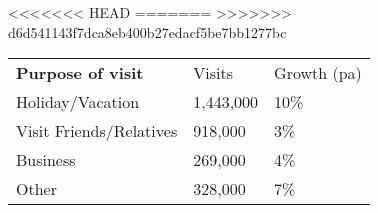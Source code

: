 <<<<<<< HEAD
=======
>>>>>>> d6d541143f7dca8eb400b27edacf5be7bb1277bc
\begin{tabular}[t]{p{4.7cm}>{\hfill}p{1.1cm}>{\hfill}p{1.7cm}}
 \textbf{Purpose of visit} & Visits & Growth (pa) \\ 
 Holiday/Vacation & 1,443,000 & 10\% \\ 
  Visit Friends/Relatives &   918,000 & 3\% \\ 
  Business &   269,000 & 4\% \\ 
  Other & 328,000 & 7\% \\ 
  \end{tabular}
